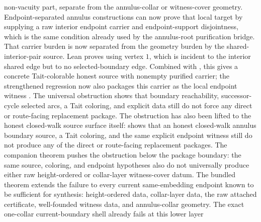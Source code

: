 \documentclass[11pt]{article}
\begin{document}
non-vacuity part, separate from the annulus-collar or witness-cover geometry.
Endpoint-separated annulus constructions can now prove that local target by
supplying a raw interior endpoint carrier and endpoint-support disjointness,
which is the same condition already used by the annulus-root purification
bridge.
That carrier burden is now separated from the geometry burden by the
shared-interior-pair source.  Lean proves
using vertex \(1\), which is incident to the interior shared edge
 but to no selected-boundary edge.  Combined with
, this gives a concrete
Tait-colorable honest source with nonempty purified carrier; the strengthened
regression now also packages this carrier as the local endpoint witness
.  The universal
obstruction
shows that boundary reachability, successor-cycle selected arcs, a Tait
coloring, and explicit  data still do not
force any direct or route-facing replacement package.  The obstruction has
also been lifted to the honest closed-walk source surface itself:
shows that an honest closed-walk annulus boundary source, a Tait coloring, and
the same explicit endpoint witness still do not produce any of the direct or
route-facing replacement packages.  The companion theorem
pushes the obstruction below the package boundary: the same source, coloring,
and endpoint hypotheses also do not universally produce either raw
height-ordered or collar-layer witness-cover datum.  The bundled theorem
extends the failure to every current same-embedding endpoint known to be
sufficient for synthesis: height-ordered data, collar-layer data, the raw
attached certificate, well-founded witness data, and annulus-collar geometry.
The exact one-collar current-boundary shell already fails at this lower layer
\end{document}
